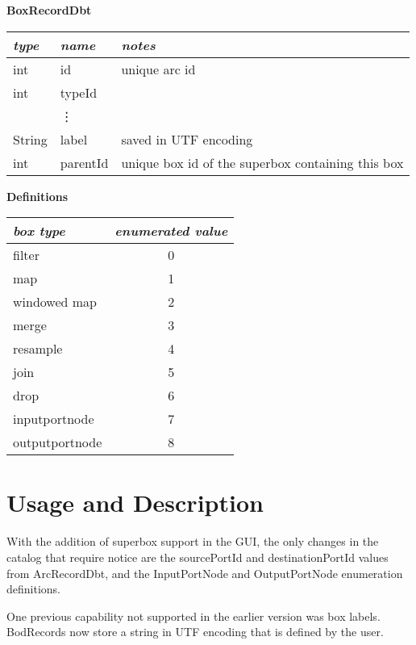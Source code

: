 \documentclass[a4paper,12pt]{article}
\begin{document}
\vspace{.1in}
\hspace{.5in}
\textbf{BoxRecordDbt}
\vspace{.1in}

\begin{tabular}{|l|l|l|}
\hline
\em type & \em name    & \em notes \\\hline
int       & id            & unique arc id \\
int       & typeId        &               \\
          & \vdots        &               \\
String    & label         & saved in UTF encoding \\
int       & parentId      & unique box id of the superbox containing this box \\\hline
\end{tabular}

\vspace{.1in}
\hspace{.5in}
\textbf{Definitions}
\vspace{.1in}

\begin{tabular}{|l|c|}
\hline
\em box type & \em enumerated value \\\hline
filter         & 0 \\
map            & 1 \\
windowed map   & 2 \\
merge          & 3 \\
resample       & 4 \\
join           & 5 \\
drop           & 6 \\
inputportnode  & 7 \\
outputportnode & 8 \\\hline           
\end{tabular}


\newpage

\section*{Usage and Description}

With the addition of superbox support in the GUI, the only changes in the catalog that require notice are the sourcePortId and destinationPortId values from ArcRecordDbt, and the InputPortNode and OutputPortNode enumeration definitions.

One previous capability not supported in the earlier version was box labels.  BodRecords now store a string in UTF encoding that is defined by the user.
\end{document}
